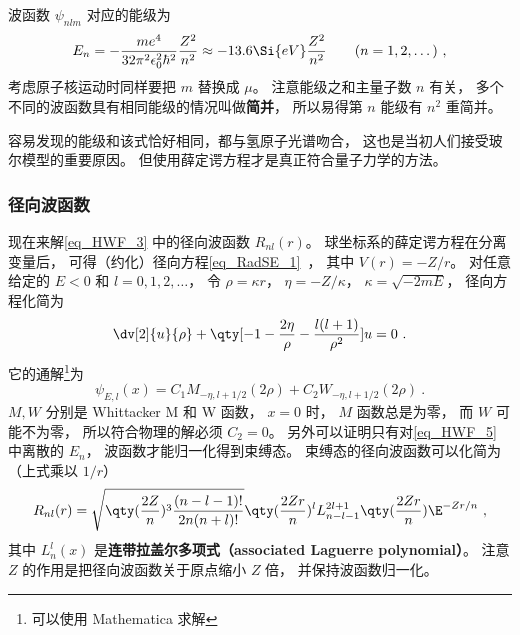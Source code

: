 波函数 $\psi_{nlm}$ 对应的能级为
\begin{equation}\label{eq_HWF_5}
E_n =  - \frac{m e^4}{32 \pi^2 \epsilon_0^2 \hbar ^2} \frac{Z^2}{n^2} \approx - 13.6\Si{eV} \frac{Z^2}{n^2}
\qquad (n = 1, 2, \dots)~,
\end{equation}
考虑原子核运动时同样要把 $m$ 替换成 $\mu$。 注意能级之和主量子数 $n$ 有关， 多个不同的波函数具有相同能级的情况叫做\textbf{简并}， 所以易得第 $n$ 能级有 $n^2$ 重简并。

容易发现的能级和该式恰好相同，都与氢原子光谱吻合， 这也是当初人们接受玻尔模型的重要原因。 但使用薛定谔方程才是真正符合量子力学的方法。

\subsubsection{径向波函数}
现在来解\autoref{eq_HWF_3} 中的径向波函数 $R_{nl}(r)$。 球坐标系的薛定谔方程在分离变量后， 可得（约化）径向方程\autoref{eq_RadSE_1}~， 其中 $V(r) = -Z/r$。 对任意给定的 $E < 0$ 和 $l = 0,1,2,\dots$， 令 $\rho = \kappa r$， $\eta = -Z/\kappa$， $\kappa = \sqrt{-2mE}$， 径向方程化简为
\begin{equation}\label{eq_HWF_11}
\dv[2]{u}{\rho} + \qty[-1 - \frac{2\eta}{\rho} - \frac{l(l+1)}{\rho^2}]u = 0~.
\end{equation}
它的通解\footnote{可以使用 Mathematica 求解}为
\begin{equation}\label{eq_HWF_6}
\psi_{E,l}(x) = C_1 M_{-\eta, l+1/2}(2 \rho) + C_2 W_{-\eta, l+1/2}(2 \rho)~.
\end{equation}
$M, W$ 分别是 Whittacker M 和 W 函数， $x = 0$ 时， $M$ 函数总是为零， 而 $W$ 可能不为零， 所以符合物理的解必须 $C_2 = 0$。 另外可以证明只有对\autoref{eq_HWF_5} 中离散的 $E_n$， 波函数才能归一化得到束缚态。 束缚态的径向波函数可以化简为（上式乘以 $1/r$）
\begin{equation}\label{eq_HWF_2}
R_{nl}(r) = \sqrt{\qty(\frac{2 Z}{n})^3 \frac{(n - l - 1)!}{2n (n + l)!}} \qty(\frac{2Zr}{n})^l  L_{n-l-1}^{2l+1}\qty(\frac{2Zr}{n}) \E^{-Zr/n}~,
\end{equation}
其中 $L_n^l(x)$ 是\textbf{连带拉盖尔多项式（associated Laguerre polynomial）}。 注意 $Z$ 的作用是把径向波函数关于原点缩小 $Z$ 倍， 并保持波函数归一化。

